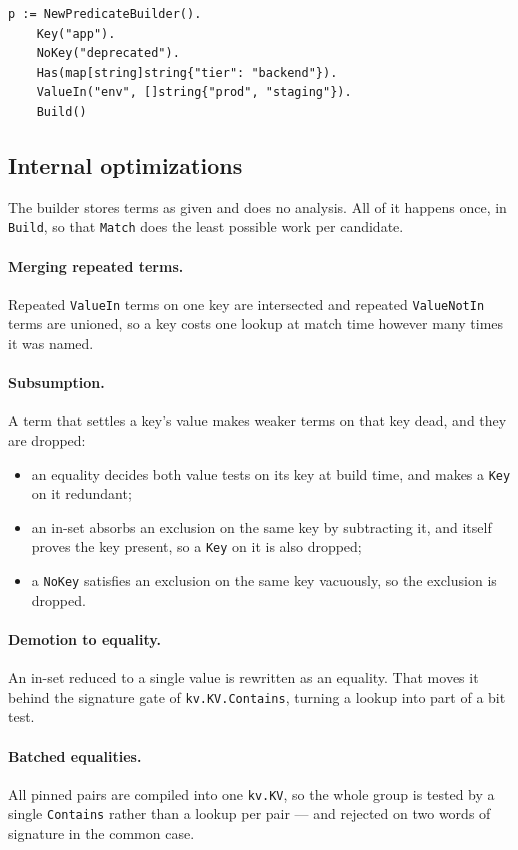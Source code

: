\documentclass[11pt]{article}
\newcommand{\code}[1]{\texttt{#1}}
\begin{document}
\begin{verbatim}
p := NewPredicateBuilder().
    Key("app").
    NoKey("deprecated").
    Has(map[string]string{"tier": "backend"}).
    ValueIn("env", []string{"prod", "staging"}).
    Build()
\end{verbatim}

\subsection{Internal optimizations}

The builder stores terms as given and does no analysis. All of it happens once,
in \code{Build}, so that \code{Match} does the least possible work per candidate.

\paragraph{Merging repeated terms.} Repeated \code{ValueIn} terms on one key are
intersected and repeated \code{ValueNotIn} terms are unioned, so a key costs one
lookup at match time however many times it was named.

\paragraph{Subsumption.} A term that settles a key's value makes weaker terms on
that key dead, and they are dropped:
\begin{itemize}
  \item an equality decides both value tests on its key at build time, and makes
    a \code{Key} on it redundant;
  \item an in-set absorbs an exclusion on the same key by subtracting it, and
    itself proves the key present, so a \code{Key} on it is also dropped;
  \item a \code{NoKey} satisfies an exclusion on the same key vacuously, so the
    exclusion is dropped.
\end{itemize}

\paragraph{Demotion to equality.} An in-set reduced to a single value is
rewritten as an equality. That moves it behind the signature gate of
\code{kv.KV.Contains}, turning a lookup into part of a bit test.

\paragraph{Batched equalities.} All pinned pairs are compiled into one
\code{kv.KV}, so the whole group is tested by a single \code{Contains} rather
than a lookup per pair --- and rejected on two words of signature in the common
case.
\end{document}
